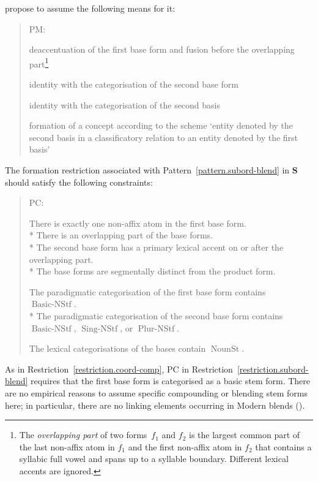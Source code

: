 \documentclass[output=paper
  ,nobabel
  ,draftmode
  ,colorlinks, citecolor=brown
]{langscibook}
\begin{document}
propose to assume the following means for it: \begin{quotation}
\begin{pattern}
\label{pattern.subord-blend}\vspace{-1.25\baselineskip}
\begin{labeledlist}{PM:}
\item[FM:] \raggedright deaccentuation of the first base form and fusion before the overlapping
part\footnote{The \emph{overlapping part} of two forms $f_{1}$ and $f_{2}$ is the largest common part of the last non-affix atom in $f_{1}$ and the first non-affix atom in $f_{2}$ that contains a syllabic full vowel and spans up to a syllable
boundary. Different lexical accents are ignored.}
\item[PM:] \raggedright identity with the categorisation of the second base form
\item[LM:] \raggedright identity with the categorisation of the second basis
\item[SM:] \raggedright formation of a concept according to the scheme ‘entity denoted by
the second basis in a classificatory relation to an entity denoted by the first
basis’
\end{labeledlist}
\end{pattern}
\end{quotation} The formation restriction associated with Pattern \ref{pattern.subord-blend} in $\mathbf{S}$ should satisfy the following constraints: \begin{quotation}
\begin{restriction}
\label{restriction.subord-blend}\vspace{-1.25\baselineskip}
\begin{labeledlist}{PC:}
\item[FC:] \raggedright There is exactly one non-affix atom in the first base
form.\\*{}
There is an overlapping part of the base forms.\\*{}
The second base form has a primary lexical accent on or after the overlapping
part.\\*{}
The base forms are segmentally distinct from the product form.
\item[PC:] \raggedright The paradigmatic categorisation of the first base form contains $\operatorname{Basic-NStf}$.\\*{}
The paradigmatic categorisation of the second base form contains $\operatorname{Basic-NStf}$, $\operatorname{Sing-NStf}$, or $\operatorname{Plur-NStf}$.
\item[LC:] \raggedright The lexical categorisations of the bases contain $\operatorname{NounSt}$.
\end{labeledlist}
\end{restriction}
\end{quotation} As in Restriction \ref{restriction.coord-comp}, PC in Restriction \ref{restriction.subord-blend} requires that the first base form is
categorised as a basic stem form. There are no empirical reasons to assume
specific compounding or blending stem forms here; in particular, there are no linking elements
occurring in Modern  blends (\citealt[78]{mueller:et:al:2011:kontamination}).
\end{document}
